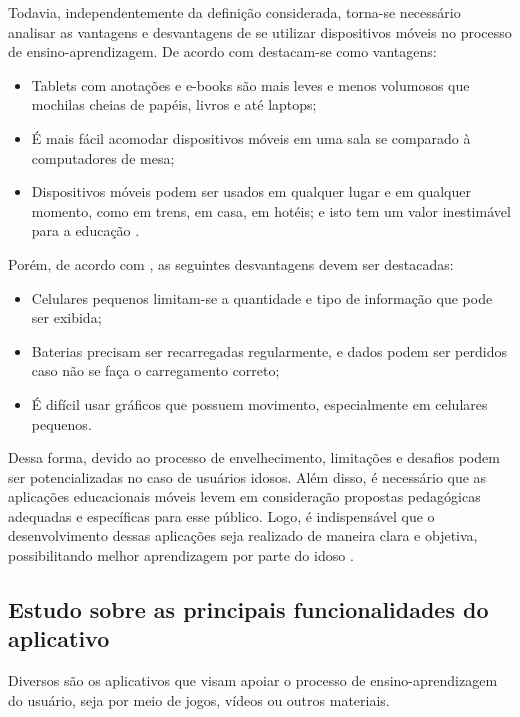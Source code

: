Todavia, independentemente da definição considerada, torna-se necessário analisar as vantagens e desvantagens de se utilizar dispositivos móveis no processo de ensino-aprendizagem. De acordo com \cite{RICHAMEHTA2016} destacam-se como vantagens: 

\begin{itemize}
    \item Tablets com anotações e e-books são mais leves e menos volumosos que mochilas cheias de papéis, livros e até laptops;
    \item É mais fácil acomodar dispositivos móveis em uma sala se comparado à computadores de mesa;
    \item Dispositivos móveis podem ser usados em qualquer lugar e em qualquer momento, como em trens, em casa, em hotéis; e isto tem um valor inestimável para a educação \citep{CarmaMaia2008}.
\end{itemize}

Porém, de acordo com \cite{RICHAMEHTA2016}, as seguintes desvantagens devem ser destacadas: 

\begin{itemize}
    \item Celulares pequenos limitam-se a quantidade e tipo de informação que pode ser exibida;
    \item Baterias precisam ser recarregadas regularmente, e dados podem ser perdidos caso não se faça o carregamento correto;
    \item É difícil usar gráficos que possuem movimento, especialmente em celulares pequenos.
\end{itemize}

Dessa forma, devido ao processo de envelhecimento, limitações e desafios podem ser potencializadas no caso de usuários idosos. Além disso, é necessário que as aplicações educacionais móveis levem em consideração propostas pedagógicas adequadas e específicas para esse público. Logo, é indispensável que o desenvolvimento dessas aplicações seja realizado de maneira clara e objetiva, possibilitando melhor aprendizagem por parte do idoso \citep{giubilei1993pedagogia}.

\subsection{Estudo sobre as principais funcionalidades do aplicativo}
\label{sec:estudo_funcionalidades_apps}

Diversos são os aplicativos que visam apoiar o processo de ensino-aprendizagem do usuário, seja por meio de jogos, vídeos ou outros materiais. 

